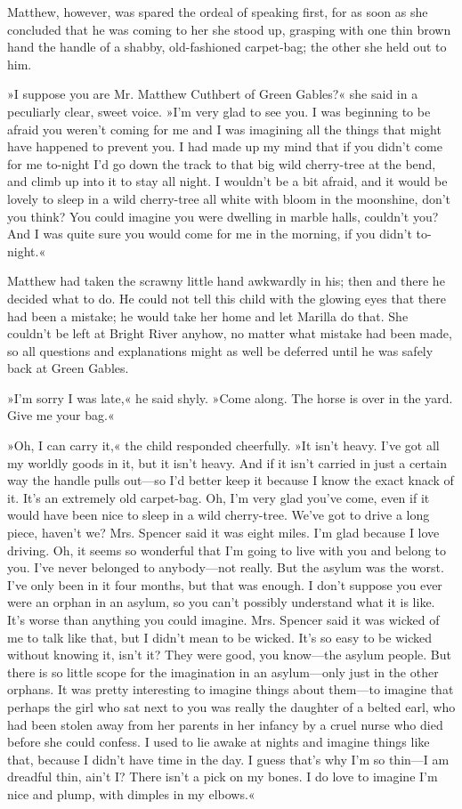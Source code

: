 Matthew, however, was spared the ordeal of speaking first, for as soon as she concluded that he was coming to her she stood up, grasping with one thin brown hand the handle of a shabby, old-fashioned carpet-bag; the other she held out to him.

»I suppose you are Mr. Matthew Cuthbert of Green Gables?« she said in a peculiarly clear, sweet voice. »I'm very glad to see you. I was beginning to be afraid you weren't coming for me and I was imagining all the things that might have happened to prevent you. I had made up my mind that if you didn't come for me to-night I'd go down the track to that big wild cherry-tree at the bend, and climb up into it to stay all night. I wouldn't be a bit afraid, and it would be lovely to sleep in a wild cherry-tree all white with bloom in the moonshine, don't you think? You could imagine you were dwelling in marble halls, couldn't you? And I was quite sure you would come for me in the morning, if you didn't to-night.«

Matthew had taken the scrawny little hand awkwardly in his; then and there he decided what to do. He could not tell this child with the glowing eyes that there had been a mistake; he would take her home and let Marilla do that. She couldn't be left at Bright River anyhow, no matter what mistake had been made, so all questions and explanations might as well be deferred until he was safely back at Green Gables.

»I'm sorry I was late,« he said shyly. »Come along. The horse is over in the yard. Give me your bag.«

»Oh, I can carry it,« the child responded cheerfully. »It isn't heavy. I've got all my worldly goods in it, but it isn't heavy. And if it isn't carried in just a certain way the handle pulls out—so I'd better keep it because I know the exact knack of it. It's an extremely old carpet-bag. Oh, I'm very glad you've come, even if it would have been nice to sleep in a wild cherry-tree. We've got to drive a long piece, haven't we? Mrs. Spencer said it was eight miles. I'm glad because I love driving. Oh, it seems so wonderful that I'm going to live with you and belong to you. I've never belonged to anybody—not really. But the asylum was the worst. I've only been in it four months, but that was enough. I don't suppose you ever were an orphan in an asylum, so you can't possibly understand what it is like. It's worse than anything you could imagine. Mrs. Spencer said it was wicked of me to talk like that, but I didn't mean to be wicked. It's so easy to be wicked without knowing it, isn't it? They were good, you know—the asylum people. But there is so little scope for the imagination in an asylum—only just in the other orphans. It was pretty interesting to imagine things about them—to imagine that perhaps the girl who sat next to you was really the daughter of a belted earl, who had been stolen away from her parents in her infancy by a cruel nurse who died before she could confess. I used to lie awake at nights and imagine things like that, because I didn't have time in the day. I guess that's why I'm so thin—I am dreadful thin, ain't I? There isn't a pick on my bones. I do love to imagine I'm nice and plump, with dimples in my elbows.«

